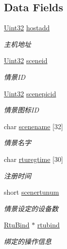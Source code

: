 \subsection*{Data Fields}
\begin{DoxyCompactItemize}
\item 
\hyperlink{base_8h_a60cf7b3c038ce37a50796e8eaddf0b5f}{Uint32} \hyperlink{structSceneInfo_a71c350f2eecece851424fb6d41f3d0e1}{hostadd}
\begin{DoxyCompactList}\small\item\em 主机地址 \end{DoxyCompactList}\item 
\hyperlink{base_8h_a60cf7b3c038ce37a50796e8eaddf0b5f}{Uint32} \hyperlink{structSceneInfo_a647950844b5a2503b7c79171273eddbc}{sceneid}
\begin{DoxyCompactList}\small\item\em 情景\-I\-D \end{DoxyCompactList}\item 
\hyperlink{base_8h_a60cf7b3c038ce37a50796e8eaddf0b5f}{Uint32} \hyperlink{structSceneInfo_affa07c03b993f4fee2824da9bf11da25}{scenepicid}
\begin{DoxyCompactList}\small\item\em 情景图标\-I\-D \end{DoxyCompactList}\item 
char \hyperlink{structSceneInfo_a802bb02389ef76cdb6c30676eb65148b}{scenename} \mbox{[}32\mbox{]}
\begin{DoxyCompactList}\small\item\em 情景名字 \end{DoxyCompactList}\item 
char \hyperlink{structSceneInfo_ac27ed61e7e699160d08904fb2abfdb95}{rturegtime} \mbox{[}30\mbox{]}
\begin{DoxyCompactList}\small\item\em 注册时间 \end{DoxyCompactList}\item 
short \hyperlink{structSceneInfo_afebc902163663be26075199ba2c97d5d}{scenertunum}
\begin{DoxyCompactList}\small\item\em 情景设定的设备数 \end{DoxyCompactList}\item 
\hyperlink{structRtuBind}{Rtu\-Bind} $\ast$ \hyperlink{structSceneInfo_a04797a4b852763ec79262575bb8d3f67}{rtubind}
\begin{DoxyCompactList}\small\item\em 绑定的操作信息 \end{DoxyCompactList}\end{DoxyCompactItemize}


